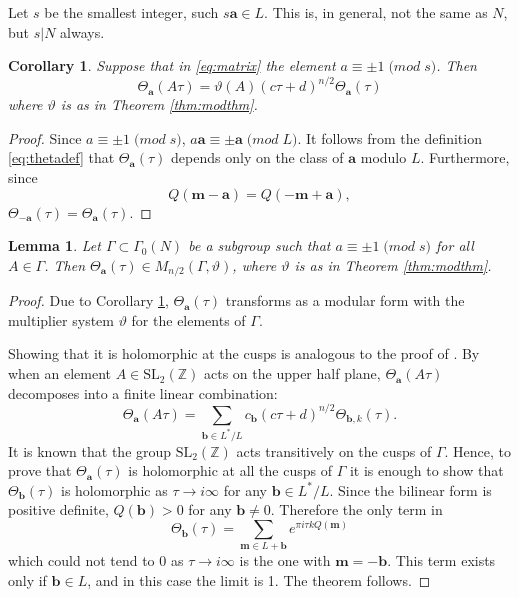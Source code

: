 \documentclass{article}
\newtheorem{lemma}[theorem]{Lemma}
\newtheorem{corollary}[theorem]{Corollary}
\theoremstyle{definition}
\newcommand{\ZZ} {{\mathbb Z}}		%
\begin{document}
Let $s$ be the smallest integer, such $s\mathbf{a} \in L$. This is, in general, not the same
as $N$, but $s|N$ always. 
\begin{corollary}
\label{cor:mult} 
Suppose that in \eqref{eq:matrix} the element $a \equiv \pm 1 \; \mathrm(mod\; s)$.
Then 
\[ \Theta_{\mathbf{a}}(A\tau)= \vartheta(A)(c\tau+d)^{n/2} \Theta_{\mathbf{a}}(\tau) \]
where $\vartheta$ is as in Theorem \ref{thm:modthm}.
\end{corollary}
\begin{proof}
Since $a \equiv \pm 1 \; \mathrm(mod\; s)$, $a \mathbf{a} \equiv \pm\mathbf{a} \; 
\mathrm(mod\; L)$. It follows from the definition \eqref{eq:thetadef} that 
$\Theta_{\mathbf{a}}(\tau)$ depends only on the class of $\mathbf{a}$ modulo $L$. 
Furthermore, since
\[ Q(\mathbf{m}-\mathbf{a})=Q(-\mathbf{m}+\mathbf{a}), \]
$\Theta_{-\mathbf{a}}(\tau)= \Theta_{\mathbf{a}}(\tau)$.
\end{proof}
\begin{lemma} 
\label{lem:mult2}
Let $\Gamma \subset \Gamma_0(N)$ be a subgroup such that $a \equiv \pm 1 \; \mathrm(mod\; s)$ for all $A \in \Gamma$. Then $\Theta_{\mathbf{a}}(\tau) \in M_{n/2}(\Gamma, \vartheta)$, where $\vartheta$ is as in Theorem \ref{thm:modthm}.
\end{lemma}
\begin{proof} Due to Corollary \ref{cor:mult}, $\Theta_{\mathbf{a}}(\tau)$ 
transforms as a modular form with the multiplier system $\vartheta$ for the elements of $\Gamma$. 
	
Showing that it is holomorphic at the cusps is analogous to the proof of 
\cite[Corollary 14.3.16]{cohen2017modular}. By \cite[Theorem 14.3.7]{cohen2017modular} when 
an element $A \in \textrm{SL}_2( \ZZ)$ acts on the upper half plane, 
$\Theta_{\mathbf{a}}(A\tau)$ decomposes into a finite linear combination:
\[ \Theta_{\mathbf{a}}(A\tau)=\sum_{\mathbf{b} \in 
L^{\ast}/L}c_{\mathbf{b}}(c\tau+d)^{n/2}\Theta_{\mathbf{b},k}(\tau). \]
It is known that the group $\textrm{SL}_2( \ZZ)$ acts transitively on the cusps of 
$\Gamma$.  Hence, to prove that $\Theta_{\mathbf{a}}(\tau)$ is holomorphic at all the cusps 
of $\Gamma$ it is enough to show that $\Theta_{\mathbf{b}}(\tau)$ is holomorphic as $\tau 
\to i\infty$ for any $\mathbf{b} \in L^{\ast}/L$. Since the bilinear form is positive 
definite, $Q(\mathbf{b})>0$ for any $\mathbf{b} \neq 0$. Therefore the only term in
\[\Theta_{\mathbf{b}}(\tau)= \sum_{\mathbf{m} \in L+\mathbf{b}}
 e^{\pi i \tau k Q(\mathbf{m})}\]
which could not tend to 0  as $\tau \to i\infty$ is the one with $\mathbf{m}=-\mathbf{b}$. 
This term exists only if $\mathbf{b} \in L$, and in this case the limit is 1. The theorem 
follows.
\end{proof}
\end{document}
